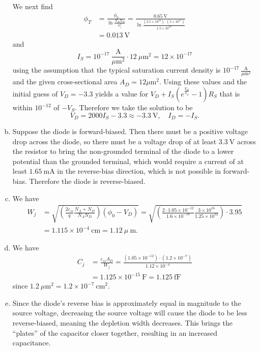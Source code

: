 \documentclass{article}
\begin{document}
\begin{enumerate}[(a)]
{    We next find
    \begin{align*}
       \phi_T
    &= \frac{\phi_0}{\ln \frac{N_A N_D}{n_i^2}}
     = \frac{0.65~\mathrm{V}}
            {\ln \frac{(2.5 \times 10^{16}) \cdot (5 \times 10^{15})}
                      {1.5 \times 10^{10}}} \\
    &= 0.013~\mathrm{V}
    \end{align*}
    and
    $$
    I_S = 10^{-17} ~\frac{\mathrm{A}}{\mu \mathrm{m}^2} \cdot 12 ~\mu\mathrm{m}^2
        = 12 \times 10^{-17}
    $$
    using the assumption that the typical saturation current density
    is $10^{-17} ~\frac{\mathrm{A}}{\mu \mathrm{m}^2}$ and the given
    cross-sectional area $A_D = 12 \mu\mathrm{m}^2$. Using these
    values and the initial guess of $V_D = -3.3$ yields a value for
    $V_D + I_S(e^{\frac{V_D}{\phi_T}} - 1)R_S$ that is within
    $10^{-12}$ of $-V_S$. Therefore we take the solution to be
    $$
    V_D = 2000 I_S - 3.3 \approx -3.3 ~\mathrm{V}, \quad I_D = -I_S.
    $$
  }
  \item{
    Suppose the diode is forward-biased. Then there must be a positive
    voltage drop across the diode, so there must be a
    voltage drop of at least $3.3~\mathrm{V}$ across the
    resistor to bring the non-grounded terminal of the diode to a
    lower potential than the grounded terminal, which would require a
    current of at least $1.65~\mathrm{mA}$ in the reverse-bias
    direction, which is not possible in forward-bias. Therefore
    the diode is reverse-biased.
  }
  \item{
    We have
    \begin{align*}
    W_j &= \sqrt{\left(
                   \frac{2 \varepsilon_{si}}{q}
                   \frac{N_A + N_D}{N_A N_D}
                 \right) (\phi_0 - V_D)}
         = \sqrt{\left(
                   \frac{2 \cdot 1.05 \times 10^{-12}}
                        {1.6 \times 10^{-19}}
                   \frac{3 \times 10^{16}}
                        {1.25 \times 10^{32}}
                  \right) \cdot 3.95} \\
        &= 1.115 \times 10^{-4} ~\mathrm{cm}
         = 1.12 ~\mu~\mathrm{m}.
    \end{align*}
  }
  \item{
    We have
    \begin{align*}
      C_j &= \frac{\varepsilon_{si} A_D}{W_j}
           = \frac{(1.05 \times 10^{-12}) \cdot (1.2 \times 10^{-7})}
                  {1.12 \times 10^{-4}} \\
          &= 1.125 \times 10^{-15} ~\mathrm{F}
           = 1.125 ~\mathrm{fF}
    \end{align*}
    since $1.2 ~\mu\mathrm{m}^2 = 1.2 \times 10^{-7} ~\mathrm{cm}^2$.
  }
  \item{
    Since the diode's reverse bias is approximately equal in magnitude
    to the source voltage, decreasing the source voltage will cause
    the diode to be less reverse-biased, meaning the depletion width
    decreases. This brings the ``plates'' of the capacitor closer
    together, resulting in an increased capacitance.
  }
\end{enumerate}
\end{document}
